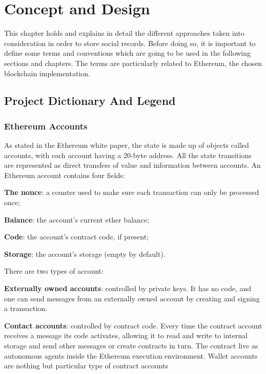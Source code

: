 \chapter{Concept and Design}
\label{chapter:concept}

This chapter holds and explains in detail the different approaches taken into consideration in order to store social records. Before doing so, it is important to define some terms and conventions which are going to be used in the following sections and chapters. The terms are particularly related to Ethereum, the chosen blockchain implementation.

\section{Project Dictionary And Legend}

\subsection*{Ethereum Accounts}
As stated in the Ethereum white paper, the state is made up of objects called accounts, with each account having a 20-byte address. All the state transitions are represented as direct transfers of value and information between accounts. An Ethereum account contains four fields:
\begin{list}{}{}
\item \textbf{The nonce}: a counter used to make sure each transaction can only be processed once;
\item \textbf{Balance}: the account's current ether balance;
\item \textbf{Code}: the account's contract code, if present;
\item \textbf{Storage}: the account's storage (empty by default).
\end{list}
There are two types of account:
\begin{list}{}{}
\item \textbf{Externally owned accounts}: controlled by private keys. It has no code, and one can send messages from an externally owned account by creating and signing a transaction.
\item \textbf{Contact accounts}: controlled by contract code. Every time the contract account receives a message its code activates, allowing it to read and write to internal storage and send other messages or create contracts in turn. The contract live as autonomous agents inside the Ethereum execution environment. Wallet accounts are nothing but particular type of contract accounts \cite{EthereumWhitePaper}
\end{list}


